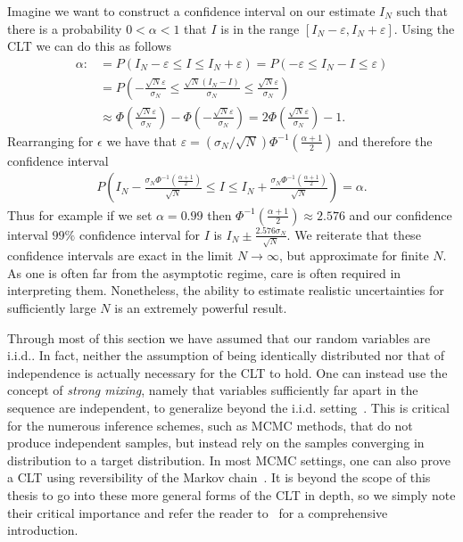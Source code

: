 Imagine we want to construct a confidence interval on our estimate $I_N$ such that there is
a probability $0<\alpha<1$ that $I$ is in the range $[I_N-\varepsilon,I_N+\varepsilon]$.  Using
the CLT we can do this as follows
\begin{align}
	\label{eq:inf:conf-int}
	\alpha :&= P(I_N-\varepsilon \le I \le I_N+\varepsilon ) = P(-\varepsilon \le I_N-I \le \varepsilon) \nonumber\\
	&= P\left(-\frac{\sqrt{N}\varepsilon}{\sigma_N}\le \frac{\sqrt{N}\left(I_N-I\right)}{\sigma_N}
				\le\frac{\sqrt{N}\varepsilon}{\sigma_N}\right) \nonumber\\
	&\approx \Phi\left(\frac{\sqrt{N}\varepsilon}{\sigma_N}\right)-
					\Phi\left(-\frac{\sqrt{N}\varepsilon}{\sigma_N}\right) = 2\Phi\left(\frac{\sqrt{N}\varepsilon}{\sigma_N}\right)-1.
\end{align}
Rearranging for $\epsilon$ we have that 
$\varepsilon = \left(\sigma_N/\sqrt{N}\right)\Phi^{-1}\left(\frac{\alpha+1}{2}\right)$
and therefore the confidence interval
\begin{align}
P\left(I_N-\frac{\sigma_N\Phi^{-1}\left(\frac{\alpha+1}{2}\right)}{\sqrt{N}} 
	\le I \le I_N+\frac{\sigma_N\Phi^{-1}\left(\frac{\alpha+1}{2}\right)}{\sqrt{N}} \right)  = \alpha.
\end{align}
Thus for example if we set $\alpha=0.99$ then $\Phi^{-1}\left(\frac{\alpha+1}{2}\right)\approx 2.576$
and our confidence interval $99\%$ confidence interval for $I$ is
 $I_N \pm \frac{2.576 \sigma_N}{\sqrt{N}}$.  We reiterate that these confidence intervals are exact
 in the limit $N\to\infty$, but approximate for finite $N$.  As one is often far from the asymptotic
 regime, care is often required in interpreting them.  Nonetheless, the ability to
 estimate realistic uncertainties for sufficiently large $N$ is an extremely powerful result.
 
Through most of this section we have assumed that our random variables are i.i.d..
In fact, neither the assumption of being identically distributed nor that of independence is actually
necessary for the CLT to hold.  One can instead use the concept of \emph{strong mixing}, namely
that variables sufficiently far apart in the sequence are independent, to generalize beyond the i.i.d.
setting~\citep{jones2004markov}.  This is critical for the numerous \mc inference schemes, 
such as MCMC methods, that
do not produce independent samples, but instead rely on the samples converging in distribution
to a target distribution.  In most MCMC settings, one can also prove a CLT using reversibility of
the Markov chain~\citep{kipnis1986central}.
It is beyond the scope of this thesis to go into these more general forms of the CLT
in depth, so we simply note their critical importance and refer the reader to~\cite{durrett2010probability}
for a comprehensive introduction.